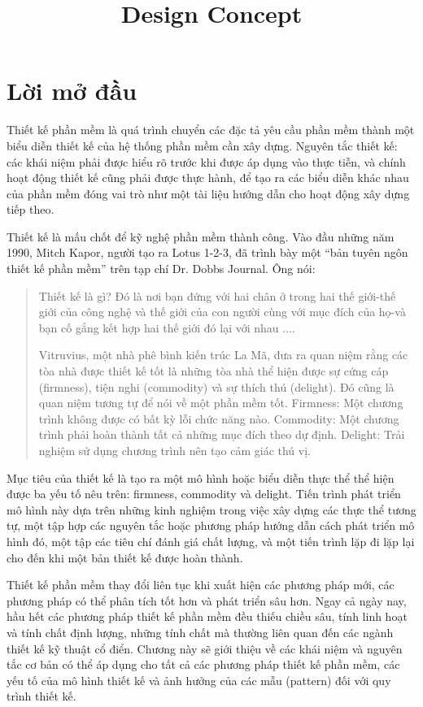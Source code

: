 \documentclass[12pt,a4paper,oneside]{article}
\title{Design Concept}
\begin{document}
	\maketitle
	\clearpage
	\tableofcontents 
	\clearpage
	\listoffigures
	\clearpage
	\listoftables
	\clearpage
	\section*{Lời mở đầu}
	Thiết kế phần mềm là quá trình chuyển các đặc tả yêu cầu phần mềm thành một biểu diễn thiết kế của hệ thống phần mềm cần xây dựng. Nguyên tắc thiết kế:  các khái niệm  phải được hiểu rõ trước khi được áp dụng vào thực tiễn, và chính hoạt động thiết kế cũng phải được thực hành, để tạo ra các biểu diễn khác nhau của phần mềm đóng vai trò như một tài liệu hướng dẫn cho hoạt động xây dựng tiếp theo.
	
	
	Thiết kế là mấu chốt để kỹ nghệ phần mềm thành công. Vào đầu những năm 1990, Mitch Kapor, người tạo ra Lotus 1-2-3, đã trình bày một “bản tuyên ngôn thiết kế phần mềm” trên tạp chí Dr. Dobbs Journal. Ông nói:
	
	
	\begin{quotation}
		Thiết kế là gì? Đó là nơi bạn đứng với hai chân ở trong hai thế giới-thế giới của công nghệ và thế giới của con người  cùng với  mục đích của họ-và bạn cố gắng kết hợp hai thế giới đó lại với nhau ....
		
		
		Vitruvius, một nhà phê bình kiến trúc La Mã, đưa ra quan niệm rằng các tòa nhà được thiết kế tốt là những tòa nhà thể hiện được sự cứng cáp (firmness), tiện nghi (commodity) và sự thích thú (delight). Đó cũng là quan niệm tương tự để nói về một phần mềm tốt. Firmness: Một chương trình không được có bất kỳ lỗi chức năng nào. Commodity: Một chương trình phải hoàn thành tất cả những mục đích theo dự định. Delight: Trải nghiệm sử dụng chương trình nên tạo cảm giác thú vị. 
		
	\end{quotation}	
	
	Mục tiêu của thiết kế là tạo ra một mô hình hoặc biểu diễn thực thể thể hiện được ba yếu tố nêu trên: firmness, commodity và delight. Tiến trình phát triển mô hình này dựa trên những kinh nghiệm trong việc xây dựng các thực thể tương tự, một tập hợp các nguyên tắc hoặc phương pháp hướng dẫn cách phát triển mô hình đó, một tập các tiêu chí đánh giá chất lượng, và một tiến trình lặp đi lặp lại cho đến khi một bản thiết kế được hoàn thành.
	
	
	Thiết kế phần mềm thay đổi liên tục khi xuất hiện các phương pháp mới, các phương pháp có thể phân tích tốt hơn và phát triển sâu hơn. Ngay cả ngày nay, hầu hết các phương pháp thiết kế phần mềm đều thiếu chiều sâu, tính linh hoạt và tính chất định lượng, những tính chất mà thường liên quan đến các ngành thiết kế kỹ thuật cổ điển. Chương này sẽ giới thiệu về các khái niệm và nguyên tắc cơ bản có thể áp dụng cho tất cả các phương pháp thiết kế phần mềm, các yếu tố của mô hình thiết kế và ảnh hưởng của các mẫu (pattern) đối với quy trình thiết kế.
\end{document}
